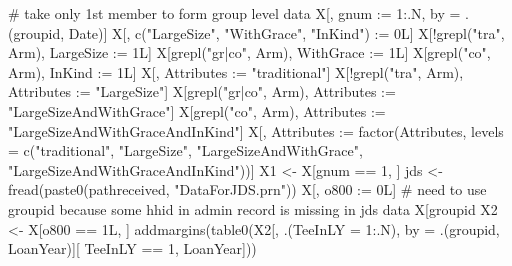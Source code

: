 \begin{Schunk}
\begin{Sinput}
# take only 1st member to form group level data
X[, gnum := 1:.N, by = .(groupid, Date)]
X[, c("LargeSize", "WithGrace", "InKind") := 0L]
X[!grepl("tra", Arm), LargeSize := 1L]
X[grepl("gr|co", Arm), WithGrace := 1L]
X[grepl("co", Arm), InKind := 1L]
X[, Attributes := "traditional"]
X[!grepl("tra", Arm), Attributes := "LargeSize"]
X[grepl("gr|co", Arm), Attributes := "LargeSizeAndWithGrace"]
X[grepl("co", Arm), Attributes := "LargeSizeAndWithGraceAndInKind"]
X[, Attributes := factor(Attributes, levels = c("traditional", "LargeSize", 
  "LargeSizeAndWithGrace", "LargeSizeAndWithGraceAndInKind"))]
X1 <- X[gnum == 1, ]
jds <- fread(paste0(pathreceived, "DataForJDS.prn"))
X[, o800 := 0L]
# need to use groupid because some hhid in admin record is missing in jds data
X[groupid %in% jds[grepl("trea", treat), groupid], o800 := 1L]
X2 <- X[o800 == 1L, ]
addmargins(table0(X2[, .(TeeInLY = 1:.N), by = .(groupid, LoanYear)][
  TeeInLY == 1, LoanYear]))
\end{Sinput}
\begin{Soutput}


\end{Soutput}
\end{Schunk}
